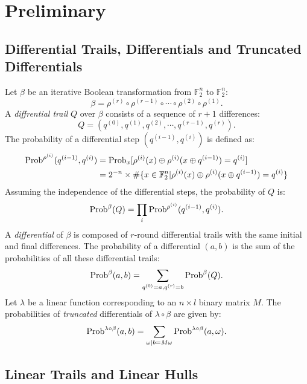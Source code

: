 \section{Preliminary\label{sec:pre}}

\subsection{Differential Trails, Differentials and Truncated Differentials}

Let $\beta$ be an iterative Boolean transformation from $\mathbb{F}_2^n$ to $\mathbb{F}_2^n$: 
\[
    \beta=\rho^{(r)}\circ\rho^{(r-1)}\circ\cdots\circ\rho^{(2)}\circ\rho^{(1)}.
\]
A \textit{diffrential trail} $Q$ over $\beta$ consists of a sequence of $r+1$ differences:
\[
    Q=(q^{(0)},q^{(1)},q^{(2)},\cdots,q^{(r-1)},q^{(r)}).
\]
The probability of a differential step $(q^{(i-1)},q^{(i)})$ is defined as:
\begin{align*}
    \text{Prob}^{\rho^{(i)}}(q^{(i-1)},q^{(i)})&=\text{Prob}_x[\rho^{(i)}(x)\oplus\rho^{(i)}(x\oplus q^{(i-1)})=q^{(i)}]\\
    &=2^{-n}\times\#\{x\in \mathbb{F}_2^n|\rho^{(i)}(x)\oplus\rho^{(i)}(x\oplus q^{(i-1)})=q^{(i)}\}
\end{align*}
Assuming the independence of the differential steps, the probability of $Q$ is:
\[
    \text{Prob}^{\beta}(Q)=\prod\limits_i\text{Prob}^{\rho^{(i)}}(q^{(i-1)},q^{(i)}).
\]
A \textit{differential} of $\beta$ is composed of $r$-round differential trails with the same initial and final differences. The probability of a differential $(a,b)$ is the sum of the probabilities of all these differential trails:
\[
    \text{Prob}^{\beta}(a,b)=\sum\limits_{q^{(0)}=a,q^{(r)}=b}\text{Prob}^{\beta}(Q).
\]
Let $\lambda$ be a linear function corresponding to an $n\times l$ binary matrix $M$. The probabilities of \textit{truncated} differentials of $\lambda\circ\beta$ are given by:
\[
    \text{Prob}^{\lambda\circ\beta}(a,b)=\sum\limits_{\omega|b=M\omega}\text{Prob}^{\lambda\circ\beta}(a,\omega).
\]

\subsection{Linear Trails and Linear Hulls}

